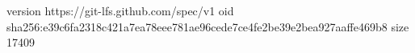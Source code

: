 version https://git-lfs.github.com/spec/v1
oid sha256:e39c6fa2318c421a7ea78eee781ae96cede7ce4fe2be39e2bea927aaffe469b8
size 17409
